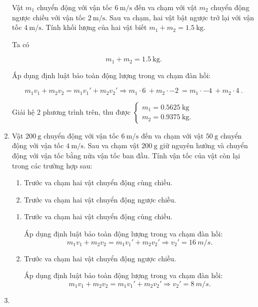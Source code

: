 \begin{enumerate}[label=\bfseries Câu \arabic*:]
	
	{
		Vật $m_1$ chuyển động với vận tốc $\SI{6}{\meter/\second}$ đến va chạm với vật $m_2$ chuyển động ngược chiều với vận tốc $\SI{2}{\meter/\second}$. Sau va chạm, hai vật bật ngược trở lại với vận tốc $\SI{4}{\meter/\second}$. Tính khối lượng của hai vật biết $m_1+m_2=\SI{ 1,5}{\kilogram}$.
	}
	
	\hideall
	{	
			Ta có 
			
			$$m_1+m_2=\SI{ 1,5}{\kilogram}.$$
		
			Áp dụng định luật bảo toàn động lượng trong va chạm đàn hồi:
			
			$$m_1v_1 + m_2 v_2 = m_1v_1' + m_2 v_2' \Rightarrow m_1\cdot\SI{6}{} + m_2 \cdot \SI{-2}{} = m_1 \cdot \SI{-4}{} + m_2 \cdot \SI{4}{}.$$
		
		Giải hệ 2 phương trình trên, thu được
		$\begin{cases}
			m_1=\SI{0,5625}{\kilogram}\\
			m_2=\SI{0,9375}{\kilogram}.
		\end{cases}$
	}
	\item {}
	
	
	{
		Vật $\SI{200}{\gram}$ chuyển động với vận tốc $\SI{6}{\meter/\second}$ đến va chạm với vật $\SI{50}{\gram}$ chuyển động với vận tốc $\SI{4}{\meter/\second}$. Sau va chạm vật $\SI{200}{\gram}$ giữ nguyên hướng và chuyển động với vận tốc bằng nửa vận tốc ban đầu. Tính vận tốc của vật còn lại trong các trường hợp sau:
		\begin{enumerate}[label=\alph*)]
			\item Trước va chạm hai vật chuyển động cùng chiều.
			\item Trước va chạm hai vật chuyển động ngược chiều.
		\end{enumerate}
	}
	
	\hideall
	{	
		\begin{enumerate}[label=\alph*)]
			\item Trước va chạm hai vật chuyển động cùng chiều.
			
			Áp dụng định luật bảo toàn động lượng trong va chạm đàn hồi:
			$$m_1v_1 + m_2 v_2 = m_1v_1' + m_2 v_2' \Rightarrow v_2'=\SI{16}{m/s}.$$
			
			\item Trước va chạm hai vật chuyển động ngược chiều.
			
			Áp dụng định luật bảo toàn động lượng trong va chạm đàn hồi:
			$$m_1v_1 + m_2 v_2 = m_1v_1' + m_2 v_2' \Rightarrow v_2'=\SI{8}{m/s}.$$
		\end{enumerate}
	}
		\item {}
	

\end{enumerate}
